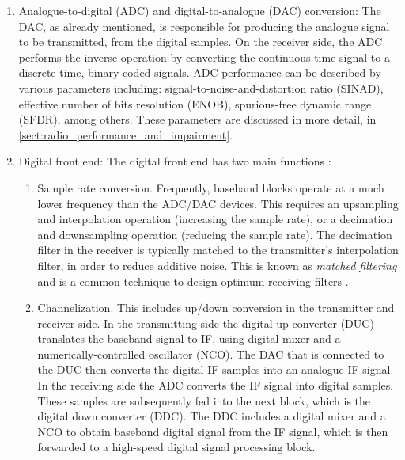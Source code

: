 \begin{enumerate}
  \item Analogue-to-digital (ADC) and digital-to-analogue (DAC) conversion: The DAC, as already mentioned, is responsible for producing the analogue signal to be transmitted, from the digital samples. On the receiver side, the ADC performs the inverse operation by converting the continuous-time signal to a discrete-time, binary-coded signals. ADC performance can be described by various parameters \cite{adc_survey} \cite{digital_frontend_sdr} including: signal-to-noise-and-distortion ratio (SINAD), effective number of bits resolution (ENOB), spurious-free dynamic range (SFDR), among others. These parameters are discussed in more detail, in \autoref{sect:radio_performance_and_impairment}.

  \item Digital front end: The digital front end has two main functions \cite{digital_frontend_sdr}:
  \begin{enumerate}
    \item  Sample rate conversion. Frequently, baseband blocks operate at a much lower frequency than the ADC/DAC devices. This requires an upsampling and interpolation operation (increasing the sample rate), or a decimation and downsampling operation (reducing the sample rate). The decimation filter in the receiver is typically matched to the transmitter's interpolation filter, in order to reduce additive noise. This is known as \emph{matched filtering} and is a common technique to design optimum receiving filters \cite{communication_systems_carlson}.
    \item Channelization. This includes up/down conversion in the transmitter and receiver side. In the transmitting side the digital up converter (DUC) translates the baseband signal to IF, using digital mixer and a numerically-controlled oscillator (NCO). The DAC that is connected to the DUC then converts the digital IF samples into an analogue IF signal. In the receiving side the ADC converts the IF signal into digital samples. These samples are subsequently fed into the next block, which is the digital down converter (DDC). The DDC includes a digital mixer and a NCO to obtain baseband digital signal from the IF signal, which is then forwarded to a high-speed digital signal processing block.
  \end{enumerate}


\end{enumerate}
